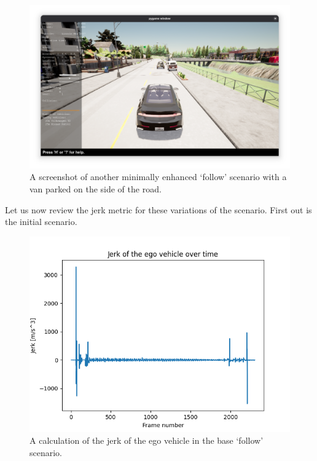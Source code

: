 \begin{figure}[htb]
    \centering
    \includegraphics[width=\textwidth]{experiment-material/follow-minimally-enhanced-2-startpoint.png}
    \caption{A screenshot of another minimally enhanced `follow' scenario with a van parked on the
        side of the road.}\label{fig:followMinimallyEnhanced2StartPoint}
\end{figure}


Let us now review the jerk metric for these variations of the scenario. First out is the initial
scenario.

\begin{figure}[htb]
    \centering
    \includegraphics[width=\textwidth]{experiment-material/follow-base-jerk.png}
    \caption{A calculation of the jerk of the ego vehicle in the base `follow' scenario.}\label{fig:followBaseJerk}
\end{figure}

